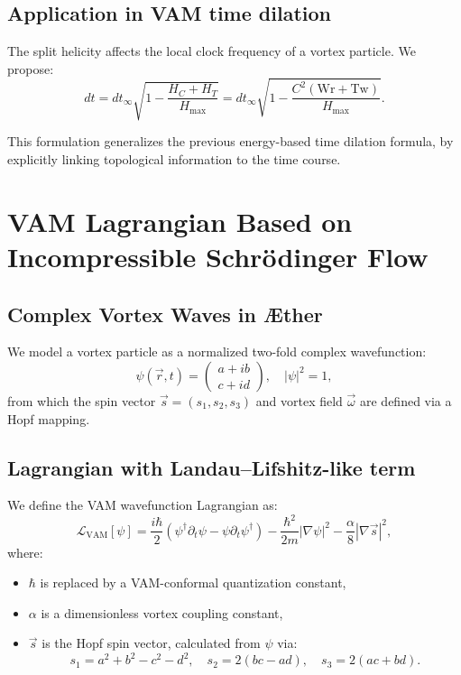 \documentclass[preprint]{revtex4-2}
\begin{document}
\subsection{Application in VAM time dilation}

The split helicity affects the local clock frequency of a vortex particle. We propose:
\begin{equation}
    dt = dt_\infty \sqrt{1 - \frac{H_C + H_T}{H_\text{max}}} = dt_\infty \sqrt{1 - \frac{C^2 (\text{Wr} + \text{Tw})}{H_\text{max}}}.
\end{equation}

This formulation generalizes the previous energy-based time dilation formula, by explicitly linking topological information to the time course.

\section{VAM Lagrangian Based on Incompressible Schrödinger Flow}\label{sec:appendix:11}

\subsection{Complex Vortex Waves in Æther}

We model a vortex particle as a normalized two-fold complex wavefunction:
\[
    \psi(\vec{r}, t) = \begin{pmatrix} a + ib \\ c + id \end{pmatrix}, \quad |\psi|^2 = 1,
\]
from which the spin vector $\vec{s} = (s_1, s_2, s_3)$ and vortex field $\vec{\omega}$ are defined via a Hopf mapping.

\subsection{Lagrangian with Landau–Lifshitz-like term}

We define the VAM wavefunction Lagrangian as:
\begin{equation}
    \mathcal{L}_\text{VAM}[\psi] =
    \frac{i\hbar}{2} \left( \psi^\dagger \partial_t \psi - \psi \partial_t \psi^\dagger \right)
    - \frac{\hbar^2}{2m} |\nabla \psi|^2
    - \frac{\alpha}{8} |\nabla \vec{s}|^2,
\end{equation}
where:
\begin{itemize}
    \item $\hbar$ is replaced by a VAM-conformal quantization constant,
    \item $\alpha$ is a dimensionless vortex coupling constant,
    \item $\vec{s}$ is the Hopf spin vector, calculated from $\psi$ via:
    \[
        s_1 = a^2 + b^2 - c^2 - d^2, \quad
        s_2 = 2(bc - ad), \quad
        s_3 = 2(ac + bd).
    \]
\end{itemize}
\end{document}
